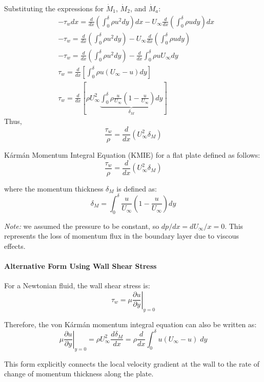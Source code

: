 Substituting the expressions for $\dot{M}_1$, $\dot{M}_2$, and $\dot{M}_a$:
\[
    \begin{aligned}
    & -\tau_w d x=\frac{d}{d x}\left(\int_0^\delta \rho u^2 d y\right) d x-U_\infty \frac{d}{d x}\left(\int_0^\delta \rho u d y\right) d x 
    \\[0.5em]
    & -\tau_w=\frac{d}{d x}\left(\int_0^\delta \rho u^2 d y\right)-U_\infty \frac{d}{d x}\left(\int_0^\delta \rho u d y\right)
    \\[0.5em]
    & -\tau_w=\frac{d}{d x}\left(\int_0^\delta \rho u^2 d y\right)-\frac{d}{d x} \int_0^\delta \rho u U_\infty d y
    \\[0.5em]
    & \tau_w=\frac{d}{d x}\left[\int_0^\delta \rho u(U_\infty-u) d y\right]
    \\[0.5em]
    & \tau_w =\frac{d}{d x}\left[\rho U_\infty^2 \underbrace{\int_0^\delta \rho \frac{u}{U_\infty}\left(1-\frac{u}{U_\infty}\right) d y}_{\delta_M}\right]
    \end{aligned}
\]
%
Thus,
\[
    \frac{\tau_w}{\rho}=\frac{d}{d x}\left(U_\infty^2 \delta_M\right)
\]
\begin{definition}[KMIE]
Kármán Momentum Integral Equation (KMIE) for a flat plate defined as follows:
\[
    \frac{\tau_w}{\rho}=\frac{d}{d x}\left(U_\infty^2 \delta_M\right)
\]

%
where the momentum thickness $\delta_M$ is defined as:
\[
    \delta_M = \int_0^{\delta} \frac{u}{U_\infty}\left(1-\frac{u}{U_\infty}\right)dy
\]

\end{definition}

%
\textit{Note:} we assumed the pressure to be constant, so $dp/dx = dU_\infty/x = 0$.
%
This represents the loss of momentum flux in the boundary layer due to viscous effects. 
%
\paragraph{Alternative Form Using Wall Shear Stress}
For a Newtonian fluid, the wall shear stress is:
\[
    \tau_w = \mu\left.\frac{\partial u}{\partial y}\right|_{y=0}
\]

Therefore, the von Kármán momentum integral equation can also be written as:
\[
    \mu\left.\frac{\partial u}{\partial y}\right|_{y=0} = \rho U_\infty^2 \frac{d\delta_M}{dx} = \rho \frac{d}{d x} \int_0^\delta u\left(U_{\infty}-u\right)\;dy
\]


This form explicitly connects the local velocity gradient at the wall to the rate of change of momentum thickness along the plate.
